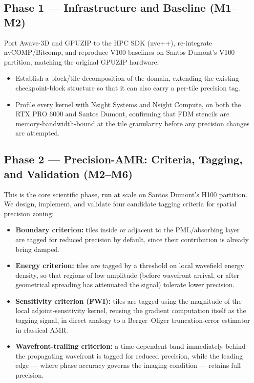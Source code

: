 \documentclass[12pt,a4paper]{article}
\begin{document}
\subsection{Phase 1 --- Infrastructure and Baseline (M1--M2)}

Port Awave-3D and GPUZIP to the HPC SDK (nvc++), re-integrate nvCOMP/Bitcomp, and
reproduce V100 baselines on Santos Dumont's V100 partition, matching the original
GPUZIP hardware.

\begin{itemize}
  \item Establish a block/tile decomposition of the domain, extending the
        existing checkpoint-block structure so that it can also carry a per-tile
        precision tag.
  \item Profile every kernel with Nsight Systems and Nsight Compute, on both the
        RTX PRO 6000 and Santos Dumont, confirming that FDM stencils are
        memory-bandwidth-bound at the tile granularity before any precision
        changes are attempted.
\end{itemize}

\subsection{Phase 2 --- Precision-AMR: Criteria, Tagging, and Validation (M2--M6)}

This is the core scientific phase, run at scale on Santos Dumont's H100
partition. We design, implement, and validate four candidate tagging criteria for
spatial precision zoning:

\begin{itemize}
  \item \textbf{Boundary criterion:} tiles inside or adjacent to the
        PML/absorbing layer are tagged for reduced precision by default, since
        their contribution is already being damped.
  \item \textbf{Energy criterion:} tiles are tagged by a threshold on local
        wavefield energy density, so that regions of low amplitude (before
        wavefront arrival, or after geometrical spreading has attenuated the
        signal) tolerate lower precision.
  \item \textbf{Sensitivity criterion (FWI):} tiles are tagged using the
        magnitude of the local adjoint-sensitivity kernel, reusing the gradient
        computation itself as the tagging signal, in direct analogy to a
        Berger--Oliger truncation-error estimator in classical AMR.
  \item \textbf{Wavefront-trailing criterion:} a time-dependent band immediately
        behind the propagating wavefront is tagged for reduced precision, while
        the leading edge --- where phase accuracy governs the imaging condition
        --- retains full precision.
\end{itemize}
\end{document}
